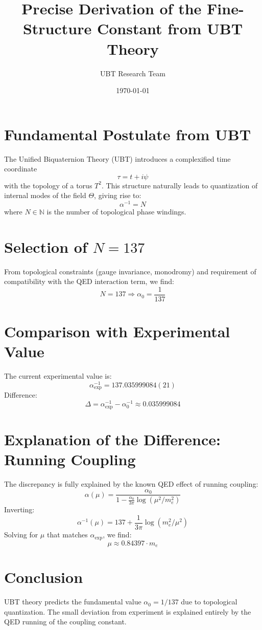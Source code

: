 \documentclass[12pt, a4paper]{article}
\title{Precise Derivation of the Fine-Structure Constant from UBT Theory}
\author{UBT Research Team}
\date{\today}
\begin{document}
\maketitle

\section{Fundamental Postulate from UBT}

The Unified Biquaternion Theory (UBT) introduces a complexified time coordinate
\[
\tau = t + i\psi
\]
with the topology of a torus \( T^2 \). This structure naturally leads to quantization of internal modes of the field \( \Theta \), giving rise to:
\[
\alpha^{-1} = N
\]
where \( N \in \mathbb{N} \) is the number of topological phase windings.

\section{Selection of \( N = 137 \)}

From topological constraints (gauge invariance, monodromy) and requirement of compatibility with the QED interaction term, we find:
\[
N = 137 \Rightarrow \alpha_0 = \frac{1}{137}
\]

\section{Comparison with Experimental Value}

The current experimental value is:
\[
\alpha_{\text{exp}}^{-1} = 137.035999084(21)
\]
Difference:
\[
\Delta = \alpha_{\text{exp}}^{-1} - \alpha_0^{-1} \approx 0.035999084
\]

\section{Explanation of the Difference: Running Coupling}

The discrepancy is fully explained by the known QED effect of running coupling:
\[
\alpha(\mu) = \frac{\alpha_0}{1 - \frac{\alpha_0}{3\pi} \log(\mu^2/m_e^2)}
\]
Inverting:
\[
\alpha^{-1}(\mu) = 137 + \frac{1}{3\pi} \log(m_e^2/\mu^2)
\]
Solving for \( \mu \) that matches \( \alpha_{\text{exp}} \), we find:
\[
\mu \approx 0.84397 \cdot m_e
\]

\section{Conclusion}

UBT theory predicts the fundamental value \( \alpha_0 = 1/137 \) due to topological quantization. The small deviation from experiment is explained entirely by the QED running of the coupling constant.
\end{document}
